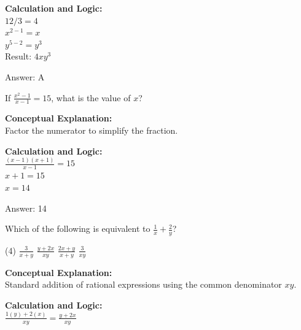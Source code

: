 \documentclass[11pt,paper=a4,answers]{exam}
\begin{document}
\begin{questions}
\begin{solution}
\vspace{20pt}

\textbf{Calculation and Logic:} \\
$12/3 = 4$ \\
$x^{2-1} = x$ \\
$y^{5-2} = y^3$ \\
Result: $4xy^3$

\vspace{25pt}

Answer: \colorbox{yellow!100}{A}
\end{solution}

\vspace{40pt}

\question
If $\frac{x^2-1}{x-1} = 15$, what is the value of $x$?

\begin{solution}
\textbf{Conceptual Explanation:} \\
Factor the numerator to simplify the fraction.

\vspace{20pt}

\textbf{Calculation and Logic:} \\
$\frac{(x-1)(x+1)}{x-1} = 15$ \\
$x + 1 = 15$ \\
$x = 14$

\vspace{25pt}

Answer: \colorbox{yellow!100}{14}
\end{solution}

\vspace{40pt}

\question
Which of the following is equivalent to $\frac{1}{x} + \frac{2}{y}$?
\begin{tasks}(4)
    \task $\frac{3}{x+y}$
    \task $\frac{y+2x}{xy}$
    \task $\frac{2x+y}{x+y}$
    \task $\frac{3}{xy}$
\end{tasks}

\begin{solution}
\textbf{Conceptual Explanation:} \\
Standard addition of rational expressions using the common denominator $xy$.

\vspace{20pt}

\textbf{Calculation and Logic:} \\
$\frac{1(y) + 2(x)}{xy} = \frac{y + 2x}{xy}$


\end{solution}
\end{questions}
\end{document}
